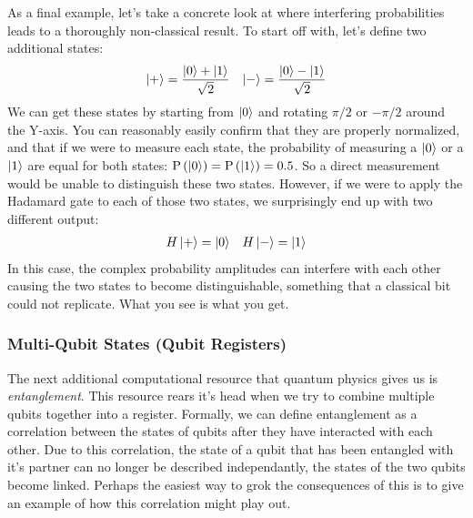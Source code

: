 As a final example, let's take a concrete look at where interfering probabilities leads to a thoroughly
non-classical result. To start off with, let's define two additional states:
\begin{align}
  \ket{+} = \frac{\ket{0} + \ket{1}}{\sqrt{2}} && \ket{-} = \frac{\ket{0} - \ket{1}}{\sqrt{2}}
\end{align}
We can get these states by starting from $\ket{0}$ and rotating $\pi/2$ or $-\pi/2$ around the Y-axis. You can
reasonably easily confirm that they are properly normalized, and that if we were to measure each state, the
probability of measuring a $\ket{0}$ or a $\ket{1}$ are equal for both states: $\mathrm{P}\left(\ket{0}\right) = 
\mathrm{P}\left(\ket{1}\right) = 0.5$. So a direct measurement would be unable to distinguish these two states.
However, if we were to apply the Hadamard gate to each of those two states, we surprisingly end up with two
different output:
\begin{align}
  H\ket{+} = \ket{0} && H\ket{-} = \ket{1}
\end{align}
In this case, the complex probability amplitudes can interfere with each other causing the two states to
become distinguishable, something that a classical bit could not replicate. What you see is what you get.

\subsubsection{Multi-Qubit States (Qubit Registers)}
The next additional computational resource that quantum physics gives us is \emph{entanglement}. This 
resource rears it's head when we try to combine multiple qubits together into a register. Formally,
we can define entanglement as a correlation between the states of qubits after they have interacted
with each other. Due to this correlation, the state of a qubit that has been entangled with it's partner
can no longer be described independantly, the states of the two qubits become linked. Perhaps the easiest
way to grok the consequences of this is to give an example of how this correlation might play out.

